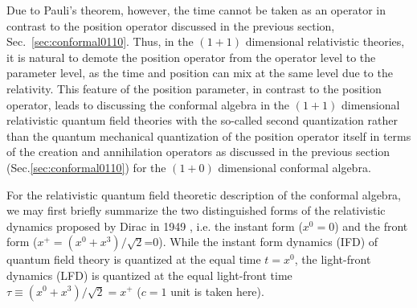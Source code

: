 \documentclass[%
 reprint,
superscriptaddress,
 amsmath,amssymb,
 aps,
]{revtex4-2}
\begin{document}
Due to Pauli's theorem\cite{Galapon1999}, however, the time cannot be taken as an operator in contrast to the position operator discussed in the previous section, Sec.~\ref{sec:conformal0110}. Thus, in the $(1+1)$ dimensional relativistic theories, it is natural to demote the position operator from the operator level to the parameter level, as the time and position can mix at the same level due to the relativity. This feature of the position parameter, in contrast to the position operator, leads to   
discussing the conformal algebra in the $(1+1)$ dimensional relativistic quantum field theories 
with the so-called second quantization
rather than the quantum mechanical quantization of the position operator itself in terms of the creation and annihilation operators as discussed in the previous section (Sec.\ref{sec:conformal0110}) for the $(1+0)$ dimensional conformal algebra.  


For the relativistic quantum field theoretic description of the conformal algebra, we may first briefly summarize the two distinguished forms of the relativistic dynamics proposed by Dirac  
in 1949 \cite{Dirac1949}, i.e. the instant form ($x^{0}=0$) and the front form ($x^{+}=(x^{0}+x^{3})/\sqrt{2}$=0). 
While the instant form dynamics (IFD) of quantum field theory is quantized at the equal time $t=x^{0}$, the light-front dynamics (LFD) is quantized at the equal light-front time $\tau \equiv (x^{0}+x^{3})/\sqrt{2}=x^{+}$ ($c=1$ unit is taken here).
\end{document}
